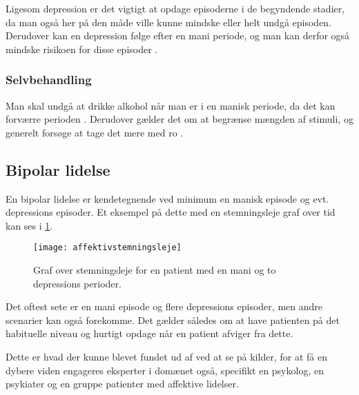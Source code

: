 Ligesom depression er det vigtigt at opdage episoderne i de begyndende stadier, da man også her på den måde ville kunne mindske eller helt undgå episoden.
Derudover kan en depression følge efter en mani periode, og man kan derfor også mindske risikoen for disse episoder \citep{misc:bipolarsundhed}.

\subsubsection{Selvbehandling}
Man skal undgå at drikke alkohol når man er i en manisk periode, da det kan forværre perioden \citep{misc:netpsykmani}.
Derudover gælder det om at begrænse mængden af stimuli, og generelt forsøge at tage det mere med ro \citep{misc:janne-rasmussen}.

\subsection{Bipolar lidelse}
En bipolar lidelse er kendetegnende ved minimum en manisk episode og evt. depressions episoder.
Et eksempel på dette med en stemningsleje graf over tid kan ses i \cref{fig:stemningslejegrafeksempel}.

\begin{figure}
	\centering
	\texttt{[image: affektivstemningsleje]}
	\caption{Graf over stemningsleje for en patient med en mani og to depressions perioder.}\label{fig:stemningslejegrafeksempel}
\end{figure}

Det oftest sete er en mani episode og flere depressions episoder, men andre scenarier kan også forekomme.
Det gælder således om at have patienten på det habituelle niveau og hurtigt opdage når en patient afviger fra dette.

Dette er hvad der kunne blevet fundet ud af ved at se på kilder, for at få en dybere viden engageres eksperter i domænet også, specifikt en psykolog, en psykiater og en gruppe patienter med affektive lidelser.